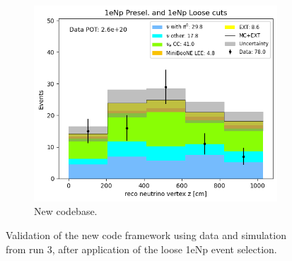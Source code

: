 \begin{figure}[H]
\begin{subfigure}[t]{0.32\linewidth}
        \includegraphics[width=\linewidth]{technote/Appendix_Validation/Figures/1eNp_Loose/Run3_Vertex_Z_Alex.png}
        \caption{New codebase.}
    \end{subfigure}
    \caption{Validation of the new code framework using data and simulation from run 3, after application of the loose 1eNp event selection.}
\end{figure}







